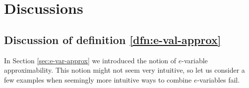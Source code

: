 \documentclass{article}
\newtheorem{theorem}{Theorem}
\theoremstyle{definition}
\theoremstyle{definition}
\newcommand{\probP}{\mathbb{P}}
\begin{document}


    




\section{Discussions}\label{sec:discs}

\subsection{Discussion of definition \ref{dfn:e-val-approx}}\label{sec:dfn-arguments}

In Section \ref{sec:e-var-approx} we introduced the notion of $e$-variable approximability.
This notion might not seem very intuitive, so let us consider a few examples when seemingly more intuitive ways to combine $e$-variables fail.
\end{document}
